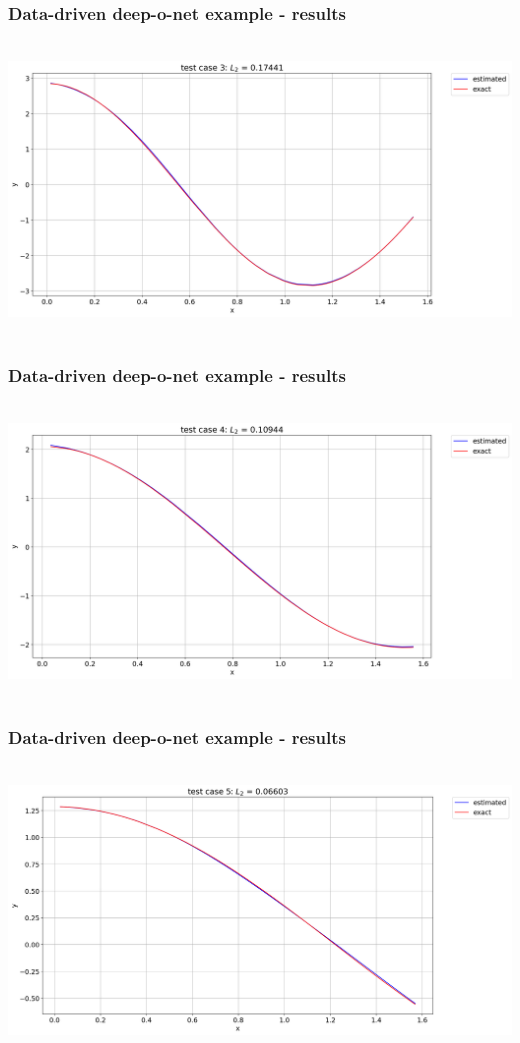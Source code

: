 \begin{frame}
    \frametitle{Data-driven deep-o-net example - results}
    \hbox{\hspace{-1cm}
        \includegraphics[scale=0.32]{supportingFiles/DON_results/test_case_3.png}\hspace{5cm}
    }
\end{frame}

\begin{frame}
    \frametitle{Data-driven deep-o-net example - results}
    \hbox{\hspace{-1cm}
        \includegraphics[scale=0.32]{supportingFiles/DON_results/test_case_4.png}\hspace{5cm}
    }
\end{frame}

\begin{frame}
    \frametitle{Data-driven deep-o-net example - results}
    \hbox{\hspace{-1cm}
        \includegraphics[scale=0.32]{supportingFiles/DON_results/test_case_5.png}\hspace{5cm}
    }
\end{frame}

